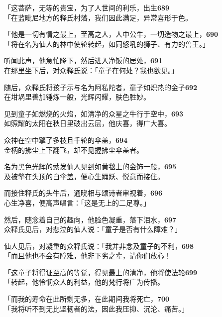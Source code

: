 「这菩萨，无等的贵宝，为了人世间的利乐，出生\hfill{\grayfootnotesize \textbf{689}} \\
「在蓝毗尼地方的释氏村落，我们因此满足，异常喜形于色。


「他是一切有情之最上，至高之人，人中公牛，一切造物之最上，\hfill{\grayfootnotesize \textbf{690}} \\
「将在名为仙人的林中使轮转起，如同怒吼的狮子、有力的兽王。」


听闻此声，他急忙降下，然后进入净饭的居处，\hfill{\grayfootnotesize \textbf{691}} \\
在那里坐下后，对众释氏说：「童子在何处？我也欲见。」


随后，众释氏将孩子示与名为阿私陀者，童子如炽热的金子\hfill{\grayfootnotesize \textbf{692}} \\
在坩埚里善加锤炼一般，光辉闪耀，肤色胜妙。


见到童子如燃烧的火焰，如清净的众星之牛行于空中，\hfill{\grayfootnotesize \textbf{693}} \\
如照耀的太阳在秋日里破出云层，他庆喜，得广大喜。


众神在空中擎了多枝且千轮的伞盖，\hfill{\grayfootnotesize \textbf{694}} \\
金柄的拂尘上下翻飞，却不见握拂尘伞盖者。


名为黑色光辉的萦发仙人见到如黄毯上的金饰一般，\hfill{\grayfootnotesize \textbf{695}} \\
及被擎在头顶的白伞盖，便心生踊跃、悦意而接住。


而接住释氏的头牛后，通晓相与颂诗者审视着，\hfill{\grayfootnotesize \textbf{696}} \\
心生净喜，便高声唱言：「这是无上的二足尊。」


然后，随念着自己的趣向，他脸色凝重，落下泪水，\hfill{\grayfootnotesize \textbf{697}} \\
众释氏见后，对悲泣的仙人说：「童子是否有什么障难？」


仙人见后，对凝重的众释氏说：「我并非念及童子的不利，\hfill{\grayfootnotesize \textbf{698}} \\
「而且他也不会有障难，他非下劣之辈，请你们放心！


「这童子将得证至高的等觉，得见最上的清净，他将使法轮\hfill{\grayfootnotesize \textbf{699}} \\
「转起，他怜悯众人的利益，他的梵行将广为传播。


「而我的寿命在此所剩无多，在此期间我将死亡，\hfill{\grayfootnotesize \textbf{700}} \\
「我将听不到无比坚韧者的法，因此我压抑、沉沦、痛苦。」


